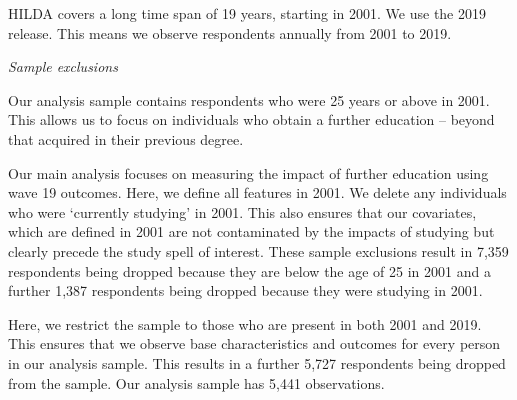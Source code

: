 \documentclass[12pt, a4paper]{article}
\begin{document}
HILDA covers a long time span of 19 years, starting in 2001. We use the 2019 release. This means we observe respondents annually from 2001 to 2019.

\emph{Sample exclusions}

Our analysis sample contains respondents who were 25 years or above in 2001. This allows us to focus on individuals who obtain a further education – beyond that acquired in their previous degree. 

Our main analysis focuses on measuring the impact of further education using wave 19 outcomes. Here, we define all features in 2001. We delete any individuals who were ‘currently studying’ in 2001. This also ensures that our covariates, which are defined in 2001 are not contaminated by the impacts of studying but clearly precede the study spell of interest. These sample exclusions result in 7,359 respondents being dropped because they are below the age of 25 in 2001 and a further 1,387 respondents being dropped because they were studying in 2001.

Here, we restrict the sample to those who are present in both 2001 and 2019. This ensures that we observe base characteristics and outcomes for every person in our analysis sample. This results in a further 5,727 respondents being dropped from the sample. Our analysis sample has 5,441 observations.


%
\end{document}
